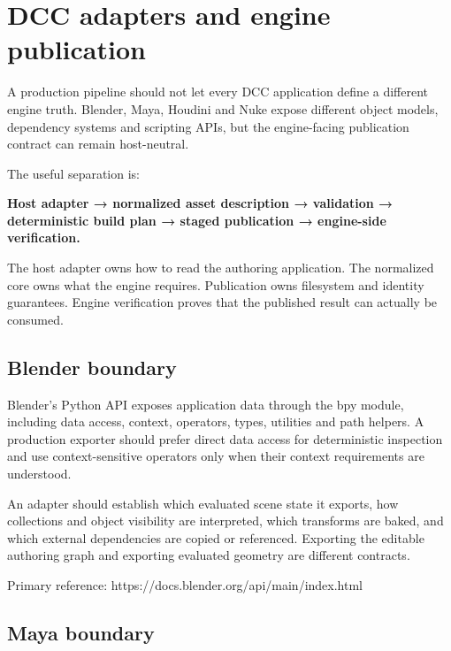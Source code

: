 \hypertarget{appendix-03ade9e1875f}{}\label{referencestart:appendix-03ade9e1875f}
\section{DCC adapters and engine publication}\label{appendix-03ade9e1875f-dcc-adapters-and-engine-publication}

\hypertarget{appendix-03ade9e1875f-dcc-adapters-and-engine-publication}{}

A production pipeline should not let every DCC application define a different engine truth. Blender, Maya, Houdini and Nuke expose different object models, dependency systems and scripting APIs, but the engine-facing publication contract can remain host-neutral.

The useful separation is:

\textbf{Host adapter → normalized asset description → validation → deterministic build plan → staged publication → engine-side verification.}

The host adapter owns how to read the authoring application. The normalized core owns what the engine requires. Publication owns filesystem and identity guarantees. Engine verification proves that the published result can actually be consumed.

\subsection{Blender boundary}\label{appendix-03ade9e1875f-blender-boundary}

\hypertarget{appendix-03ade9e1875f-blender-boundary}{}

Blender's Python API exposes application data through the bpy module, including data access, context, operators, types, utilities and path helpers. A production exporter should prefer direct data access for deterministic inspection and use context-sensitive operators only when their context requirements are understood.

An adapter should establish which evaluated scene state it exports, how collections and object visibility are interpreted, which transforms are baked, and which external dependencies are copied or referenced. Exporting the editable authoring graph and exporting evaluated geometry are different contracts.

Primary reference: https://docs.blender.org/api/main/index.html

\subsection{Maya boundary}\label{appendix-03ade9e1875f-maya-boundary}

